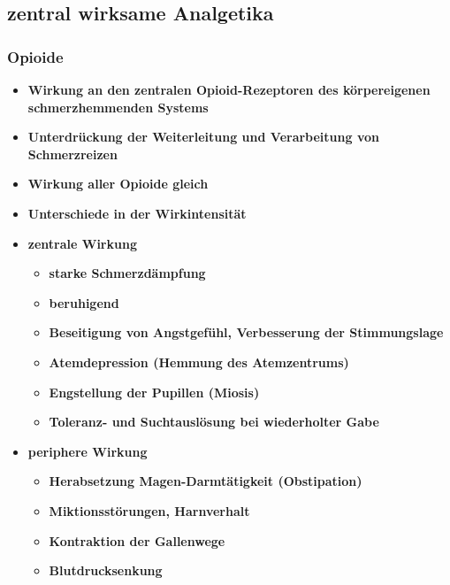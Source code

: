 \subsection{zentral wirksame Analgetika}
\subsubsection{Opioide}
	\begin{itemize}
		\item \textbf{Wirkung an den zentralen Opioid-Rezeptoren des körpereigenen schmerzhemmenden Systems}
		\item \textbf{Unterdrückung der Weiterleitung und Verarbeitung von Schmerzreizen}
		\item \textbf{Wirkung aller Opioide gleich}
		\item \textbf{Unterschiede in der Wirkintensität}
		\item \textbf{zentrale Wirkung}
			\begin{itemize}
				\item \textbf{starke Schmerzdämpfung}
				\item \textbf{beruhigend}
				\item \textbf{Beseitigung von Angstgefühl, Verbesserung der Stimmungslage}
				\item \textbf{Atemdepression (Hemmung des Atemzentrums)}
				\item \textbf{Engstellung der Pupillen (Miosis)}
				\item \textbf{Toleranz- und Suchtauslösung bei wiederholter Gabe}
			\end{itemize}
		\item \textbf{periphere Wirkung}
			\begin{itemize}
				\item \textbf{Herabsetzung Magen-Darmtätigkeit (Obstipation)}
				\item \textbf{Miktionsstörungen, Harnverhalt}
				\item \textbf{Kontraktion der Gallenwege}
				\item \textbf{Blutdrucksenkung}
			\end{itemize}
	\end{itemize}
				
